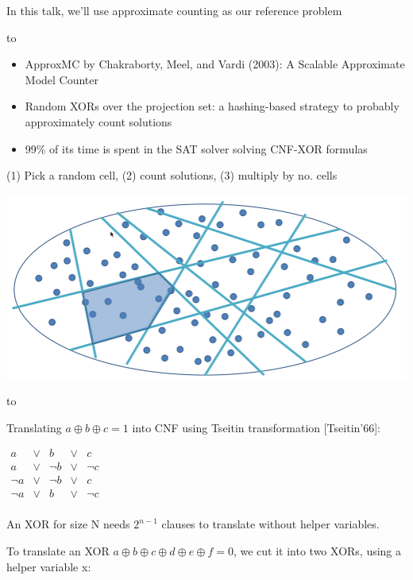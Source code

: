 \documentclass[aspectratio=196]{slides}
\def\TITLE#1{\hbox to \linewidth{\large #1\hfill}}
\def\BOTTOM{\vfill\newpage}
\def\SLIDE#1{\BOTTOM\TITLE{#1}}
\begin{document}
In this talk, we'll use approximate counting as our reference problem

\vfill
\newpage
\SLIDE{Motivating Problem: Approximate Counting}

\begin{itemize}
\item ApproxMC by Chakraborty, Meel, and Vardi (2003): A Scalable Approximate Model Counter
\item Random XORs over the projection set: a hashing-based strategy to probably approximately count solutions
\item 99\% of its time is spent in the SAT solver solving CNF-XOR formulas
\end{itemize}

(1) Pick a random cell, (2) count solutions, (3) multiply by no. cells
\begin{center}
\includegraphics[width=24cm]{cuts_on_plane.png}
\end{center}

\vfill
\newpage


\SLIDE{XORs in CNF}

Translating $a\oplus b\oplus c=1$ into CNF using Tseitin transformation [Tseitin'66]:

$\begin{array}{rrrrr}
a& \vee &b& \vee &c\\
a& \vee &\neg b& \vee &\neg c\\
\neg a& \vee &\neg b& \vee &c\\
\neg a& \vee &b& \vee &\neg c\\
\end{array}$

An XOR for size N needs $2^{n-1}$ clauses to translate without helper variables.

To translate an XOR $a\oplus b\oplus c\oplus d\oplus e\oplus f=0$, we cut it into two XORs, using a helper variable {\color{red}x}:
\end{document}
